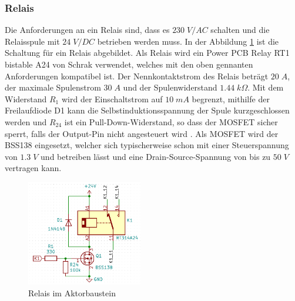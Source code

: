 \subsubsection{Relais}
Die Anforderungen an ein Relais sind, dass es $230\;V/AC$ schalten und die Relaisspule mit $24\;V/DC$ betrieben werden muss. In der Abbildung \ref{pic: Relais_aktor} ist die Schaltung für ein Relais abgebildet. Als Relais wird ein Power PCB Relay RT1 bistable A24 von Schrak verwendet, welches mit den oben gennanten Anforderungen kompatibel ist. Der Nennkontaktstrom des Relais beträgt $20\;A$, der maximale Spulenstrom $30\;A$ und der Spulenwiderstand $1.44\;k\Omega$. Mit dem Widerstand $R_1$ wird der Einschaltstrom auf $10\;mA$ begrenzt, mithilfe der Freilaufdiode D1 kann die Selbstinduktionsspannung der Spule kurzgeschlossen werden und $R_{24}$ ist ein Pull-Down-Widerstand, so dass der MOSFET sicher sperrt, falls der Output-Pin nicht angesteuert wird \cite{mikrocontroller.net_relais_nodate}. Als MOSFET wird der BSS138 eingesetzt, welcher sich typischerweise schon mit einer Steuerspannung von $1.3\;V$ und betreiben lässt und eine Drain-Source-Spannung von bis zu $50\;V$ vertragen kann.
\begin{figure}[h!]
	\centering
	\includegraphics[width=0.45\textwidth]{graphics/shematics_relais.png}
	\caption{Relais im Aktorbaustein}
	\label{pic: Relais_aktor}
\end{figure}

